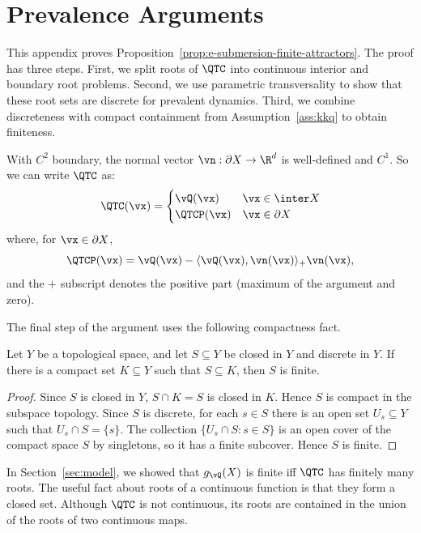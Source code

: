 \section{Prevalence Arguments}
\label{appendix:prevalence}

This appendix proves Proposition~\ref{prop:e-submersion-finite-attractors}. The
proof has three steps. First, we split roots of $\QTC$ into continuous interior
and boundary root problems. Second, we use parametric transversality to show
that these root sets are discrete for prevalent dynamics. Third, we combine
discreteness with compact containment from Assumption~\ref{ass:kkq} to obtain
finiteness.

\begin{remark}
    With $C^2$ boundary, the normal vector $\vn:\partial X \to \R^d$ is well-defined and $C^1$. So we can write $\QTC$ as:
    \[
        \QTC(\vx)=
        \begin{cases}
            \vQ(\vx) & \vx \in \inter X \\
            \QTCP(\vx) & \vx \in \partial X
        \end{cases}
    \]
    where, for $\vx\in\partial X$,
    \[
        \QTCP(\vx)=
        \vQ(\vx) - \langle \vQ(\vx), \vn(\vx) \rangle_+ \vn(\vx),
    \]
    and the $+$ subscript denotes the positive part (maximum of the argument and zero).
\end{remark}

The final step of the argument uses the following compactness fact.

\begin{lemma}\label{lemma:closed-discrete-finite}
Let $Y$ be a topological space, and let $S\subseteq Y$ be closed in $Y$ and
discrete in $Y$. If there is a compact set $K\subseteq Y$ such that
$S\subseteq K$, then $S$ is finite.
\end{lemma}
\begin{proof}
Since $S$ is closed in $Y$, $S\cap K=S$ is closed in $K$. Hence $S$ is compact
in the subspace topology. Since $S$ is discrete, for each $s\in S$ there is an
open set $U_s\subseteq Y$ such that $U_s\cap S=\{s\}$. The collection
$\{U_s\cap S:s\in S\}$ is an open cover of the compact space $S$ by singletons,
so it has a finite subcover. Hence $S$ is finite.
\end{proof}

In Section~\ref{sec:model}, we showed that $g_{\vQ}(X)$ is finite iff $\QTC$
has finitely many roots. The useful fact about roots of a continuous function is
that they form a closed set. Although $\QTC$ is not continuous, its roots are
contained in the union of the roots of two continuous maps.

